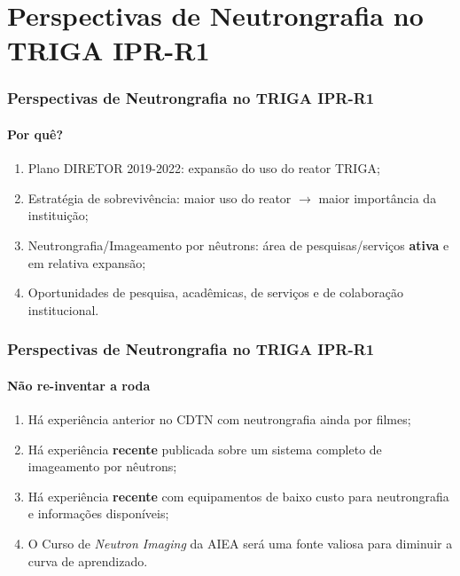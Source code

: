 \documentclass[svgnames,smaller,table]{beamer}
\begin{document}
\section{Perspectivas de Neutrongrafia no TRIGA IPR-R1}
\begin{frame}
  \frametitle{Perspectivas de Neutrongrafia no TRIGA IPR-R1}
  \framesubtitle{Por quê?}
  \begin{enumerate}
  \item Plano DIRETOR 2019-2022: expansão do uso do reator TRIGA;
  \item Estratégia de sobrevivência: maior uso do reator $\rightarrow$ maior importância da instituição;
  \item Neutrongrafia/Imageamento por nêutrons: área de pesquisas/serviços \textbf{ativa} e em relativa expansão;%
  \item Oportunidades de pesquisa, acadêmicas, de serviços e de colaboração institucional.
  \end{enumerate}
\end{frame}

\begin{frame}
  \frametitle{Perspectivas de Neutrongrafia no TRIGA IPR-R1}
  \framesubtitle{Não re-inventar a roda}
  \begin{enumerate}
  \item Há experiência anterior no CDTN com neutrongrafia ainda por filmes\cite{Antonella2002,Antonella2003};
  \item Há experiência \textbf{recente} publicada sobre um sistema completo de imageamento por nêutrons\cite{Wilson2017}; %
  \item Há experiência \textbf{recente} com equipamentos de baixo custo para neutrongrafia e informações disponíveis\cite{Schillinger2019,Turkoglu2013};
    \item O Curso de \textit{Neutron Imaging} da AIEA será uma fonte valiosa para diminuir a curva de aprendizado.
    \end{enumerate}
\end{frame}
\end{document}
